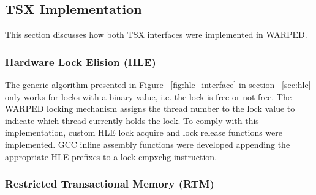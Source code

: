 \documentclass[a4paper]{article}
\begin{document}
%
%

\subsection{\textbf{TSX Implementation}}

This section discusses how both TSX interfaces were implemented in WARPED.

\subsubsection{\textbf{Hardware Lock Elision (HLE)}}

The generic algorithm presented in Figure ~\ref{fig:hle_interface} in section
~\ref{sec:hle} only works for locks with a binary value, i.e. the lock is free
or not free.  The WARPED locking mechanism assigns the thread number to the lock
value to indicate which thread currently holds the lock.  To comply with this
implementation, custom HLE lock acquire and lock release functions were
implemented.  GCC inline assembly functions were developed appending the
appropriate HLE prefixes to a lock cmpxchg instruction. 

\subsubsection{\textbf{Restricted Transactional Memory (RTM)}}
\end{document}
